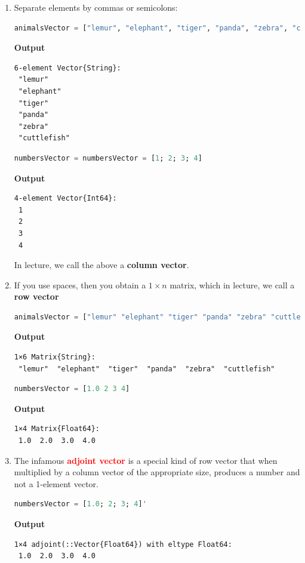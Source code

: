 \begin{enumerate}
        \renewcommand{\labelenumi}{(\alph{enumi})}
        \setlength{\itemsep}{.1cm}
    \item Separate elements by commas or semicolons:
    \begin{lstlisting}[language=Julia,style=mystyle]
animalsVector = ["lemur", "elephant", "tiger", "panda", "zebra", "cuttlefish"]
\end{lstlisting}
\textbf{Output} 
\begin{verbatim}
6-element Vector{String}:
 "lemur"
 "elephant"
 "tiger"
 "panda"
 "zebra"
 "cuttlefish"
\end{verbatim}

\begin{lstlisting}[language=Julia,style=mystyle]
numbersVector = numbersVector = [1; 2; 3; 4]
\end{lstlisting}
\textbf{Output} 
\begin{verbatim}
4-element Vector{Int64}:
 1
 2
 3
 4
\end{verbatim}

In lecture, we call the above a \textbf{column vector}.
  
    \item If you use spaces, then you obtain a $1 \times n$ matrix, which in lecture, we call a \textbf{row vector}
    \begin{lstlisting}[language=Julia,style=mystyle]
animalsVector = ["lemur" "elephant" "tiger" "panda" "zebra" "cuttlefish"]
\end{lstlisting}
\textbf{Output} 
\begin{verbatim}
1×6 Matrix{String}:
 "lemur"  "elephant"  "tiger"  "panda"  "zebra"  "cuttlefish"
\end{verbatim}

\begin{lstlisting}[language=Julia,style=mystyle]
numbersVector = [1.0 2 3 4]
\end{lstlisting}
\textbf{Output} 
\begin{verbatim}
1×4 Matrix{Float64}:
 1.0  2.0  3.0  4.0
\end{verbatim}

\item The infamous \textcolor{red}{\bf adjoint vector} is a special kind of row vector that when multiplied by a column vector of the appropriate size, produces a number and not a 1-element vector. 

\begin{lstlisting}[language=Julia,style=mystyle]
numbersVector = [1.0; 2; 3; 4]'
\end{lstlisting}
\textbf{Output} 
\begin{verbatim}
1×4 adjoint(::Vector{Float64}) with eltype Float64:
 1.0  2.0  3.0  4.0
\end{verbatim}


\end{enumerate}
